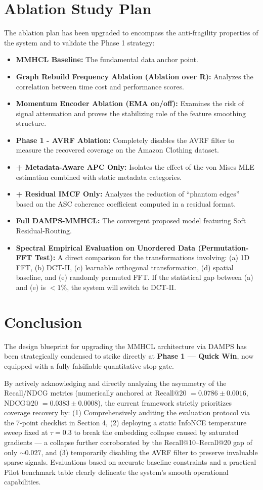 \documentclass[12pt, a4paper]{article}
\begin{document}
\section{Ablation Study Plan}
The ablation plan has been upgraded to encompass the anti-fragility properties of the system and to validate the Phase 1 strategy:
\begin{itemize}
\item \textbf{MMHCL Baseline:} The fundamental data anchor point.
\item \textbf{Graph Rebuild Frequency Ablation (Ablation over R):} Analyzes the correlation between time cost and performance scores.
\item \textbf{Momentum Encoder Ablation (EMA on/off):} Examines the risk of signal attenuation and proves the stabilizing role of the feature smoothing structure.
\item \textbf{Phase 1 - AVRF Ablation:} Completely disables the AVRF filter to measure the recovered coverage on the Amazon Clothing dataset.
\item \textbf{+ Metadata-Aware APC Only:} Isolates the effect of the von Mises MLE estimation combined with static metadata categories.
\item \textbf{+ Residual IMCF Only:} Analyzes the reduction of ``phantom edges'' based on the ASC coherence coefficient computed in a residual format.
\item \textbf{Full DAMPS-MMHCL:} The convergent proposed model featuring Soft Residual-Routing.
\item \textbf{Spectral Empirical Evaluation on Unordered Data (Permutation-FFT Test):} A direct comparison for the transformations involving: (a) 1D FFT, (b) DCT-II, (c) learnable orthogonal transformation, (d) spatial baseline, and (e) randomly permuted FFT. If the statistical gap between (a) and (e) is $< 1\%$, the system will switch to DCT-II.
\end{itemize}

\section{Conclusion}
The design blueprint for upgrading the MMHCL architecture via DAMPS has been strategically condensed to strike directly at \textbf{Phase 1 --- Quick Win}, now equipped with a fully falsifiable quantitative stop-gate.

By actively acknowledging and directly analyzing the asymmetry of the Recall/NDCG metrics (numerically anchored at Recall@20 $= 0.0786 \pm 0.0016$, NDCG@20 $= 0.0383 \pm 0.0008$), the current framework strictly prioritizes coverage recovery by: (1) Comprehensively auditing the evaluation protocol via the 7-point checklist in Section 4, (2) deploying a static InfoNCE temperature sweep fixed at $\tau = 0.3$ to break the embedding collapse caused by saturated gradients --- a collapse further corroborated by the Recall@10--Recall@20 gap of only $\sim 0.027$, and (3) temporarily disabling the AVRF filter to preserve invaluable sparse signals. Evaluations based on accurate baseline constraints and a practical Pilot benchmark table clearly delineate the system's smooth operational capabilities.
\end{document}
